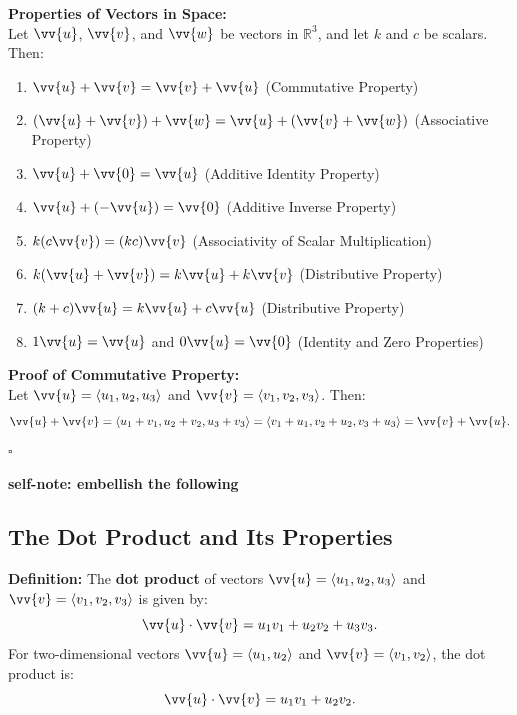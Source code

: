 \documentclass{article}
\begin{document}
\begin{theorembox}
    \textbf{Properties of Vectors in Space:} \\
    Let \(\vv{u}\), \(\vv{v}\), and \(\vv{w}\) be vectors in \(\mathbb{R}^3\), and let \(k\) and \(c\) be scalars. Then:
    \begin{enumerate}
        \item \(\vv{u} + \vv{v} = \vv{v} + \vv{u}\) \quad (Commutative Property)
        \item \((\vv{u} + \vv{v}) + \vv{w} = \vv{u} + (\vv{v} + \vv{w})\) \quad (Associative Property)
        \item \(\vv{u} + \vv{0} = \vv{u}\) \quad (Additive Identity Property)
        \item \(\vv{u} + (-\vv{u}) = \vv{0}\) \quad (Additive Inverse Property)
        \item \(k(c\vv{v}) = (kc)\vv{v}\) \quad (Associativity of Scalar Multiplication)
        \item \(k(\vv{u} + \vv{v}) = k\vv{u} + k\vv{v}\) \quad (Distributive Property)
        \item \((k + c)\vv{u} = k\vv{u} + c\vv{u}\) \quad (Distributive Property)
        \item \(1\vv{u} = \vv{u}\) and \(0\vv{u} = \vv{0}\) \quad (Identity and Zero Properties)
    \end{enumerate}
\end{theorembox}

\begin{proofbox}
    \textbf{Proof of Commutative Property:} \\
    Let \(\vv{u} = \langle u_1, u_2, u_3 \rangle\) and \(\vv{v} = \langle v_1, v_2, v_3 \rangle\). Then:
    \[
    \vv{u} + \vv{v} = \langle u_1 + v_1, u_2 + v_2, u_3 + v_3 \rangle = \langle v_1 + u_1, v_2 + u_2, v_3 + u_3 \rangle = \vv{v} + \vv{u}.
    \]
    \(\square\)
\end{proofbox}

\textbf{self-note: embellish the following}

\subsection*{The Dot Product and Its Properties}

\begin{definitionbox}
    \textbf{Definition:} The \textbf{dot product} of vectors \(\vv{u} = \langle u_1, u_2, u_3 \rangle\) and \(\vv{v} = \langle v_1, v_2, v_3 \rangle\) is given by:
    \[
    \vv{u} \cdot \vv{v} = u_1 v_1 + u_2 v_2 + u_3 v_3.
    \]
    For two-dimensional vectors \(\vv{u} = \langle u_1, u_2 \rangle\) and \(\vv{v} = \langle v_1, v_2 \rangle\), the dot product is:
    \[
    \vv{u} \cdot \vv{v} = u_1 v_1 + u_2 v_2.
    \]
\end{definitionbox}
\end{document}
